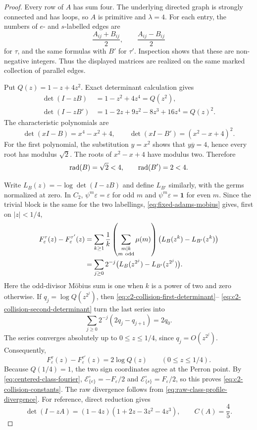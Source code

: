 \begin{proof}
Every row of \(A\) has sum four.  The underlying directed graph is strongly
connected and has loops, so \(A\) is primitive and \(\lambda=4\).  For each
entry, the numbers of \(e\)- and \(s\)-labelled edges are
\[
 \frac{A_{ij}+B_{ij}}2,\qquad \frac{A_{ij}-B_{ij}}2
\]
for \(\tau\), and the same formulas with \(B'\) for \(\tau'\).  Inspection
shows that these are non-negative integers.  Thus the displayed matrices are
realized on the same marked collection of parallel edges.

Put \(Q(z)=1-z+4z^2\).  Exact determinant calculation gives
\begin{align}
 \det(I-zB)&=1-z^2+4z^4=Q(z^2),
 \label{eq:c2-collision-first-determinant}\\
 \det(I-zB')&=1-2z+9z^2-8z^3+16z^4=Q(z)^2.
 \label{eq:c2-collision-second-determinant}
\end{align}
The characteristic polynomials are
\[
 \det(xI-B)=x^4-x^2+4,
 \qquad
 \det(xI-B')=(x^2-x+4)^2.
\]
For the first polynomial, the substitution \(y=x^2\) shows that
\(y\overline y=4\), hence every root has modulus \(\sqrt2\).  The roots of
\(x^2-x+4\) have modulus two.  Therefore
\begin{equation}\label{eq:c2-collision-gaps}
 \operatorname{rad}(B)=\sqrt2<4,
 \qquad
 \operatorname{rad}(B')=2<4.
\end{equation}

Write \(L_B(z)=-\log\det(I-zB)\) and define \(L_{B'}\) similarly, with the
germs normalized at zero.  In \(C_2\),
\(\psi^m\varepsilon=\varepsilon\) for odd \(m\) and
\(\psi^m\varepsilon=\mathbf1\) for even \(m\).  Since the trivial block is
the same for the two labellings, \eqref{eq:fixed-adams-mobius} gives, first on
\(|z|<1/4\),
\begin{align}
 F_{\varepsilon}^{\tau}(z)-F_{\varepsilon}^{\tau'}(z)
 &=\sum_{k\ge1}\frac1k
   \left(\sum_{\substack{m\mid k\\m\ \mathrm{odd}}}\mu(m)\right)
   \bigl(L_B(z^k)-L_{B'}(z^k)\bigr)\notag\\
 &=\sum_{j\ge0}2^{-j}
   \bigl(L_B(z^{2^j})-L_{B'}(z^{2^j})\bigr).
 \label{eq:c2-collision-dyadic-reduction}
\end{align}
Here the odd-divisor M\"obius sum is one when \(k\) is a power of two and
zero otherwise.  If \(q_j=\log Q(z^{2^j})\), then
\eqref{eq:c2-collision-first-determinant}--
\eqref{eq:c2-collision-second-determinant} turn the last series into
\[
 \sum_{j\ge0}2^{-j}(2q_j-q_{j+1})=2q_0.
\]
The series converges absolutely up to \(0\le z\le1/4\), since
\(q_j=O(z^{2^j})\).  Consequently,
\begin{equation}\label{eq:c2-collision-exact-difference}
 F_{\varepsilon}^{\tau}(z)-F_{\varepsilon}^{\tau'}(z)
 =2\log Q(z)\qquad(0\le z\le1/4).
\end{equation}
Because \(Q(1/4)=1\), the two sign coordinates agree at the Perron point.
By \eqref{eq:centered-class-fourier},
\(\mathcal E_{\{e\}}^\circ=-F_\varepsilon/2\) and
\(\mathcal E_{\{s\}}^\circ=F_\varepsilon/2\), so this proves
\eqref{eq:c2-collision-constants}.  The raw divergence follows from
\eqref{eq:raw-class-profile-divergence}.  For reference, direct reduction gives
\[
 \det(I-zA)=(1-4z)(1+2z-3z^2-4z^3),
 \qquad C(A)=\frac45.
\]


\end{proof}
